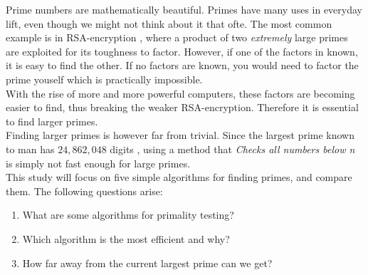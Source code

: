 \documentclass[main.tex]{subfiles}
\begin{document}
Prime numbers are mathematically beautiful. Primes have many uses in everyday
lift, even though we might not think about it that ofte. The most common example
is in RSA-encryption \cite{rsa}, where a product of two \emph{extremely} large primes are
exploited for its toughness to factor. However, if one of the factors in known,
it is easy to find the other. If no factors are known, you would need to factor
the prime youself which is practically impossible.\\

With the rise of more and more powerful computers, these factors are becoming
easier to find, thus breaking the weaker RSA-encryption. Therefore it
is essential to find larger primes. \\

Finding larger primes is however far from trivial. Since the largest prime known
to man has $24,862,048$ digits \cite{prime:largest_digits}, using a method
that \emph{Checks all numbers below n} is simply not fast enough for large
primes. \\

This study will focus on five simple algorithms for finding primes, and compare
them. The following questions arise:

\begin{enumerate}
\item What are some algorithms for primality testing?
\item Which algorithm is the most efficient and why?
\item How far away from the current largest prime can we get?
\end{enumerate}
\end{document}
